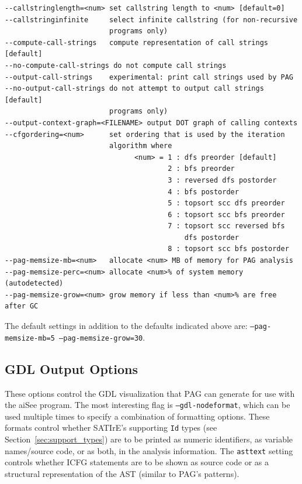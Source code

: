 \documentclass[a4paper,12pt]{report}
\begin{document}
{\footnotesize
\begin{verbatim}
--callstringlength=<num> set callstring length to <num> [default=0]
--callstringinfinite     select infinite callstring (for non-recursive
                         programs only)
--compute-call-strings   compute representation of call strings [default]
--no-compute-call-strings do not compute call strings
--output-call-strings    experimental: print call strings used by PAG
--no-output-call-strings do not attempt to output call strings [default]
                         programs only)
--output-context-graph=<FILENAME> output DOT graph of calling contexts
--cfgordering=<num>      set ordering that is used by the iteration
                         algorithm where
                               <num> = 1 : dfs preorder [default]
                                       2 : bfs preorder
                                       3 : reversed dfs postorder
                                       4 : bfs postorder
                                       5 : topsort scc dfs preorder
                                       6 : topsort scc bfs preorder
                                       7 : topsort scc reversed bfs
                                           dfs postorder
                                       8 : topsort scc bfs postorder
--pag-memsize-mb=<num>   allocate <num> MB of memory for PAG analysis
--pag-memsize-perc=<num> allocate <num>% of system memory (autodetected)
--pag-memsize-grow=<num> grow memory if less than <num>% are free after GC
\end{verbatim}
}

The default settings in addition to the defaults indicated above are:
\texttt{--pag-memsize-mb=5 --pag-memsize-grow=30}.

\subsection{GDL Output Options}

These options control the GDL visualization that PAG can generate for use
with the aiSee program. The most interesting flag is
\texttt{--gdl-nodeformat}, which can be used multiple times to specify a
combination of formatting options. These formats control whether SATIrE's
supporting \texttt{Id} types (see Section~\ref{sec:support_types}) are to be
printed as numeric identifiers, as variable names/source code, or as both,
in the analysis information. The \texttt{asttext} setting controls whether
ICFG statements are to be shown as source code or as a structural
representation of the AST (similar to PAG's patterns).
\end{document}
